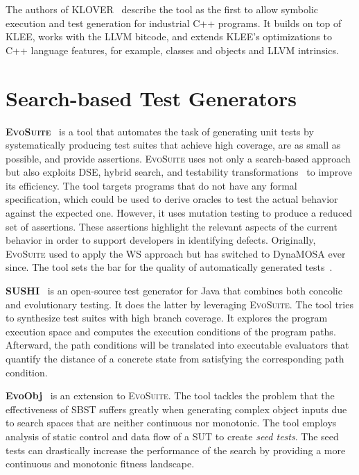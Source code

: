 \documentclass[paper=a4,%
  twoside,%
  BCOR4mm,%
  abstract=true,%
  toc=bibliography,%
  chapterprefix=true,%
  toc=bibliographynumbered,%
  open=right,%
  english,%
  pagesize=pdftex]{scrreprt}
\begin{document}
The authors of \textsc{KLOVER}~\cite{Li2011} describe the tool as the first to allow symbolic execution and test generation for industrial C++ programs. It builds on top of \textsc{KLEE}, works with the LLVM bitcode, and extends \textsc{KLEE}'s optimizations to C++ language features, for example, classes and objects and LLVM intrinsics.


\section{Search-based Test Generators}
\textbf{\textsc{EvoSuite}}~\cite{Fraser_2011} is a tool that automates the task of generating unit tests by systematically producing test suites that achieve high coverage, are as small as possible, and provide assertions. \textsc{EvoSuite} uses not only a search-based approach but also exploits \ac{DSE}, hybrid search, and testability transformations~\cite{Harman2004} to improve its efficiency. The tool targets programs that do not have any formal specification, which could be used to derive oracles to test the actual behavior against the expected one. However, it uses mutation testing to produce a reduced set of assertions. These assertions highlight the relevant aspects of the current behavior in order to support developers in identifying defects. Originally, \textsc{EvoSuite} used to apply the \ac{WS} approach but has switched to \ac{DynaMOSA} ever since. The tool sets the bar for the quality of automatically generated tests~\cite{Vogl2021,Panichella2020,Campos2019,Fraser2018,Fraser2016,Fraser2017}.

\textbf{SUSHI}~\cite{Braione2018} is an open-source test generator for Java that combines both concolic and evolutionary testing. It does the latter by leveraging \textsc{EvoSuite}. The tool tries to synthesize test suites with high branch coverage. It explores the program execution space and computes the execution conditions of the program paths. Afterward, the path conditions will be translated into executable evaluators that quantify the distance of a concrete state from satisfying the corresponding path condition.

\textbf{EvoObj}~\cite{Lin2021} is an extension to \textsc{EvoSuite}. The tool tackles the problem that the effectiveness of \ac{SBST} suffers greatly when generating complex object inputs due to search spaces that are neither continuous nor monotonic. The tool employs analysis of static control and data flow of a \ac{SUT} to create \textit{seed tests}. The seed tests can drastically increase the performance of the search by providing a more continuous and monotonic fitness landscape.
\end{document}
